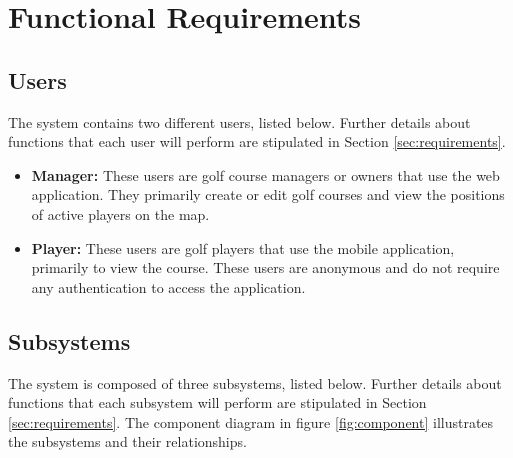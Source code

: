 \documentclass{article}
\begin{document}
    \newpage


    \section{Functional Requirements} 

    \subsection{Users}

    The system contains two different users, listed below. Further details
    about functions that each user will perform are stipulated in Section
    \ref{sec:requirements}.

    \begin{itemize}
        \item \textbf{Manager:} These users are golf course managers or owners
            that use the web application. They primarily create or edit golf
            courses and view the positions of active players on the map.
        \item \textbf{Player:} These users are golf players that use the mobile
            application, primarily to view the course. These users are
            anonymous and do not require any authentication to access the
            application.
    \end{itemize}

    \subsection{Subsystems}

    The system is composed of three subsystems, listed below. Further details
    about functions that each subsystem will perform are stipulated in Section
    \ref{sec:requirements}. The component diagram in figure \ref{fig:component}
    illustrates the subsystems and their relationships.
\end{document}
